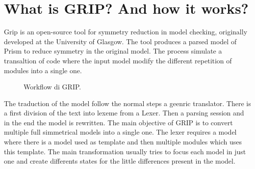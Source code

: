 \section{What is GRIP? And how it works?}
Grip is an open-source tool for symmetry reduction in model checking, originally developed at the University of Glasgow.
The tool produces a parsed model of Prism to reduce symmetry in the original model. The process simulate a transaltion of code where the input model modify the different repetition of modules into 
a single one. 
\begin{figure}[htbp]
    \centering %
    \caption{Workflow di GRIP.}
    \label{fig:grip_workflow}
\end{figure}

The traduction of the model follow the normal steps a geenric translator. There is a first division of the text into lexeme from a Lexer. Then a parsing session and in the end the model is rewritten. 
The main objective of GRIP is to convert multiple full simmetrical models into a single one. The lexer requires a model where there is a model used as template and then multiple modules which uses this template. 
The main transformation usually tries to focus each model in just one and create differents states for the little differences present in the model. 

